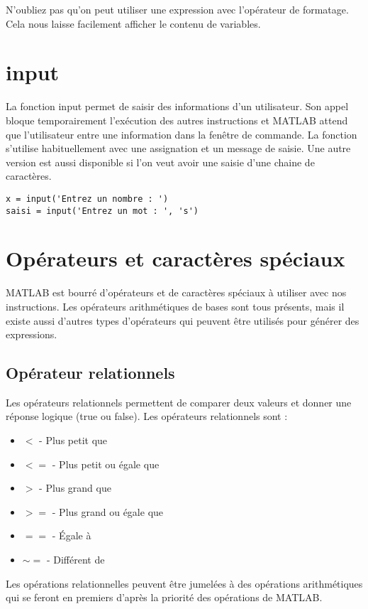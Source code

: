 \documentclass{tufte-handout}
\begin{document}
N'oubliez pas qu'on peut utiliser une expression avec l'opérateur de formatage. Cela nous laisse facilement afficher le contenu de variables.

\section{input}
La fonction input permet de saisir des informations d'un utilisateur. Son appel bloque temporairement l'exécution des autres instructions et MATLAB attend que l'utilisateur entre une information dans la fenêtre de commande.
La fonction s'utilise habituellement avec une assignation et un message de saisie.
Une autre version est aussi disponible si l'on veut avoir une saisie d'une chaine de caractères.
\begin{lstlisting}[title={Exemples d'utilisations de la fonction input}]
x = input('Entrez un nombre : ')
saisi = input('Entrez un mot : ', 's')
\end{lstlisting}

\section{Opérateurs et caractères spéciaux}
MATLAB est bourré d'opérateurs et de caractères spéciaux à utiliser avec nos instructions. Les opérateurs arithmétiques de bases sont tous présents, mais il existe aussi d'autres types d'opérateurs qui peuvent être utilisés pour générer des expressions.
\subsection{Opérateur relationnels}
Les opérateurs relationnels permettent de comparer deux valeurs et donner une réponse logique (true ou false). Les opérateurs relationnels sont :
\begin{itemize}
    \item $<$ - Plus petit que
    \item $<=$ - Plus petit ou égale que
    \item $>$ - Plus grand que
    \item $>=$ - Plus grand ou égale que
    \item $==$ - Égale à 
    \item $\ensuremath{\sim}=$ - Différent de
\end{itemize}
Les opérations relationnelles peuvent être jumelées à des opérations arithmétiques qui se feront en premiers d'après la priorité des opérations de MATLAB.
\end{document}
